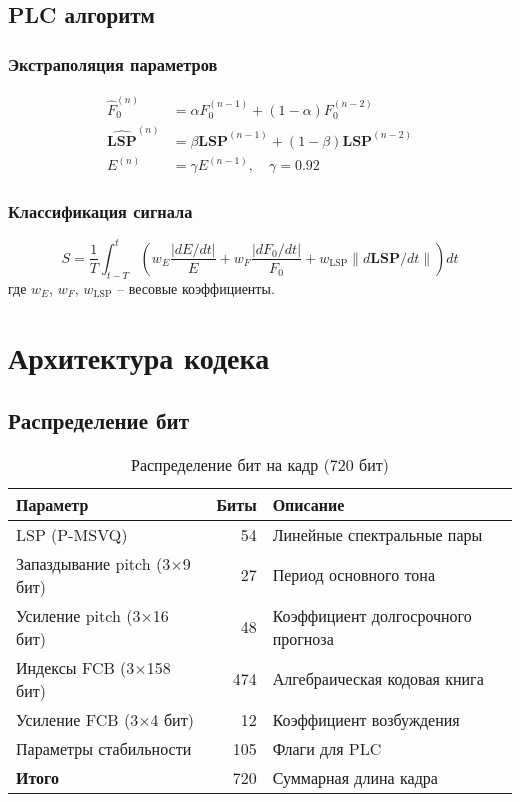 \documentclass{report}
\begin{document}
	\section{PLC алгоритм}
	\subsection{Экстраполяция параметров}
	\begin{align}
		\hat{F}_0^{(n)} &= \alpha F_0^{(n-1)} + (1-\alpha) F_0^{(n-2)} \\
		\hat{\mathbf{LSP}}^{(n)} &= \beta \mathbf{LSP}^{(n-1)} + (1-\beta) \mathbf{LSP}^{(n-2)} \\
		E^{(n)} &= \gamma E^{(n-1)}, \quad \gamma = 0.92
	\end{align}
	
	\subsection{Классификация сигнала}
	\begin{equation}
		S = \frac{1}{T} \int_{t-T}^{t} \left( w_E \frac{|dE/dt|}{E} + w_F \frac{|dF_0/dt|}{F_0} + w_{\text{LSP}} \|d\mathbf{LSP}/dt\| \right) dt
	\end{equation}
	где $w_E$, $w_F$, $w_{\text{LSP}}$ -- весовые коэффициенты.
	
	\chapter{Архитектура кодека}
	\section{Распределение бит}
	\begin{table}[H]
		\centering
		\caption{Распределение бит на кадр (720 бит)}
		\begin{tabular}{lrl}
			\toprule
			\textbf{Параметр} & \textbf{Биты} & \textbf{Описание} \\
			\midrule
			LSP (P-MSVQ) & 54 & Линейные спектральные пары \\
			Запаздывание pitch (3$\times$9 бит) & 27 & Период основного тона \\
			Усиление pitch (3$\times$16 бит) & 48 & Коэффициент долгосрочного прогноза \\
			Индексы FCB (3$\times$158 бит) & 474 & Алгебраическая кодовая книга \\
			Усиление FCB (3$\times$4 бит) & 12 & Коэффициент возбуждения \\
			Параметры стабильности & 105 & Флаги для PLC \\
			\bottomrule
			\textbf{Итого} & 720 & Суммарная длина кадра \\
			\bottomrule
		\end{tabular}
	\end{table}
	
\end{document}
